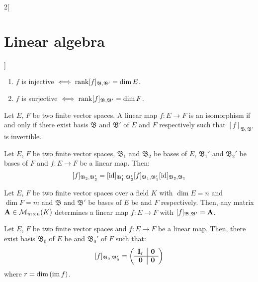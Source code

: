 \documentclass[../../../main.tex]{subfiles}
\begin{document}
\begin{multicols}{2}[\section{Linear algebra}]
\begin{corollary}
    \begin{enumerate}
        \item $f$ is injective $\iff\rank[f]_{\mathfrak{B},\mathfrak{B}'}=\dim E$.
        \item $f$ is surjective $\iff\rank[f]_{\mathfrak{B},\mathfrak{B}'}=\dim F$.
    \end{enumerate}
\end{corollary}
\begin{corollary}
    Let $E$, $F$ be two finite vector spaces. A linear map $f:E\rightarrow F$ is an isomorphism if and only if there exist basis $\mathfrak{B}$ and $\mathfrak{B}'$ of $E$ and $F$ respectively such that $[f]_{\mathfrak{B},\mathfrak{B}'}$ is invertible.
\end{corollary}
\begin{prop}
    Let $E$, $F$ be two finite vector spaces, $\mathfrak{B}_1$ and $\mathfrak{B}_2$ be bases of $E$, $\mathfrak{B}_1'$ and $\mathfrak{B}_2'$ be bases of $F$ and $f:E\rightarrow F$ be a linear map. Then: $$[f]_{\mathfrak{B}_2,\mathfrak{B}_2'}=[\mathrm{id}]_{\mathfrak{B}_1',\mathfrak{B}_2'}[f]_{\mathfrak{B}_1,\mathfrak{B}_1'}[\mathrm{id}]_{\mathfrak{B}_2,\mathfrak{B}_1}$$
\end{prop}
\begin{lemma}
    Let $E$, $F$ be two finite vector spaces over a field $K$ with $\dim E=n$ and $\dim F=m$ and $\mathfrak{B}$ and $\mathfrak{B}'$ be bases of $E$ be and $F$ respectively. Then, any matrix $\vb{A}\in\mathcal{M}_{m\times n}(K)$ determines a linear map $f:E\rightarrow F$ with $[f]_{\mathfrak{B},\mathfrak{B}'}=\vb{A}$.
\end{lemma}
\begin{theorem}
    Let $E$, $F$ be two finite vector spaces and $f:E\rightarrow F$ be a linear map. Then, there exist basis $\mathfrak{B}_0$ of $E$ be and $\mathfrak{B}_0'$ of $F$ such that: 
    $$[f]_{\mathfrak{B}_0,\mathfrak{B}_0'}=\left(
    \begin{array}{c|c}
        \vb{I}_r & \vb{0}\\
        \hline
        \vb{0} & \vb{0}
    \end{array}\right)$$
    where $r=\dim\left(\operatorname{im} f\right)$.
\end{theorem}

\end{multicols}
\end{document}
